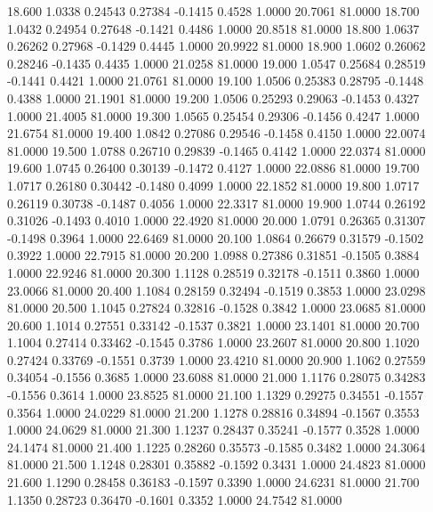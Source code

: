   18.600   1.0338   0.24543   0.27384  -0.1415   0.4528   1.0000  20.7061  81.0000
  18.700   1.0432   0.24954   0.27648  -0.1421   0.4486   1.0000  20.8518  81.0000
  18.800   1.0637   0.26262   0.27968  -0.1429   0.4445   1.0000  20.9922  81.0000
  18.900   1.0602   0.26062   0.28246  -0.1435   0.4435   1.0000  21.0258  81.0000
  19.000   1.0547   0.25684   0.28519  -0.1441   0.4421   1.0000  21.0761  81.0000
  19.100   1.0506   0.25383   0.28795  -0.1448   0.4388   1.0000  21.1901  81.0000
  19.200   1.0506   0.25293   0.29063  -0.1453   0.4327   1.0000  21.4005  81.0000
  19.300   1.0565   0.25454   0.29306  -0.1456   0.4247   1.0000  21.6754  81.0000
  19.400   1.0842   0.27086   0.29546  -0.1458   0.4150   1.0000  22.0074  81.0000
  19.500   1.0788   0.26710   0.29839  -0.1465   0.4142   1.0000  22.0374  81.0000
  19.600   1.0745   0.26400   0.30139  -0.1472   0.4127   1.0000  22.0886  81.0000
  19.700   1.0717   0.26180   0.30442  -0.1480   0.4099   1.0000  22.1852  81.0000
  19.800   1.0717   0.26119   0.30738  -0.1487   0.4056   1.0000  22.3317  81.0000
  19.900   1.0744   0.26192   0.31026  -0.1493   0.4010   1.0000  22.4920  81.0000
  20.000   1.0791   0.26365   0.31307  -0.1498   0.3964   1.0000  22.6469  81.0000
  20.100   1.0864   0.26679   0.31579  -0.1502   0.3922   1.0000  22.7915  81.0000
  20.200   1.0988   0.27386   0.31851  -0.1505   0.3884   1.0000  22.9246  81.0000
  20.300   1.1128   0.28519   0.32178  -0.1511   0.3860   1.0000  23.0066  81.0000
  20.400   1.1084   0.28159   0.32494  -0.1519   0.3853   1.0000  23.0298  81.0000
  20.500   1.1045   0.27824   0.32816  -0.1528   0.3842   1.0000  23.0685  81.0000
  20.600   1.1014   0.27551   0.33142  -0.1537   0.3821   1.0000  23.1401  81.0000
  20.700   1.1004   0.27414   0.33462  -0.1545   0.3786   1.0000  23.2607  81.0000
  20.800   1.1020   0.27424   0.33769  -0.1551   0.3739   1.0000  23.4210  81.0000
  20.900   1.1062   0.27559   0.34054  -0.1556   0.3685   1.0000  23.6088  81.0000
  21.000   1.1176   0.28075   0.34283  -0.1556   0.3614   1.0000  23.8525  81.0000
  21.100   1.1329   0.29275   0.34551  -0.1557   0.3564   1.0000  24.0229  81.0000
  21.200   1.1278   0.28816   0.34894  -0.1567   0.3553   1.0000  24.0629  81.0000
  21.300   1.1237   0.28437   0.35241  -0.1577   0.3528   1.0000  24.1474  81.0000
  21.400   1.1225   0.28260   0.35573  -0.1585   0.3482   1.0000  24.3064  81.0000
  21.500   1.1248   0.28301   0.35882  -0.1592   0.3431   1.0000  24.4823  81.0000
  21.600   1.1290   0.28458   0.36183  -0.1597   0.3390   1.0000  24.6231  81.0000
  21.700   1.1350   0.28723   0.36470  -0.1601   0.3352   1.0000  24.7542  81.0000
